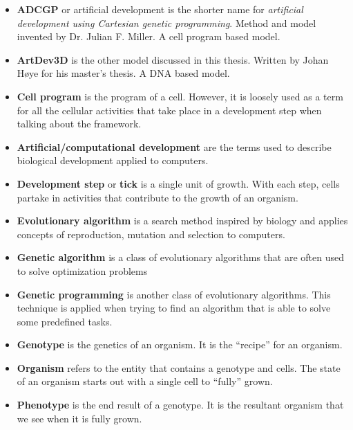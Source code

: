 \begin{itemize}
\itemsep=0pt
	\item\textbf{ADCGP} or artificial development is the shorter name for \emph{artificial development using Cartesian genetic programming}. Method and model invented by Dr. Julian F. Miller. A cell program based model.
	\item\textbf{ArtDev3D} is the other model discussed in this thesis. Written by Johan H{\o}ye for his master's thesis. A DNA based model.
	\item\textbf{Cell program} is the program of a cell. However, it is loosely used as a term for all the cellular activities that take place in a development step when talking about the framework.
	\item\textbf{Artificial/computational development} are the terms used to describe biological development applied to computers.
	\item\textbf{Development step} or \textbf{tick} is a single unit of growth. With each step, cells partake in activities that contribute to the growth of an organism.
	\item\textbf{Evolutionary algorithm} is a search method inspired by biology and applies concepts of reproduction, mutation and selection to computers.
	\item\textbf{Genetic algorithm} is a class of evolutionary algorithms that are often used to solve optimization problems
	\item\textbf{Genetic programming} is another class of evolutionary algorithms. This technique is applied when trying to find an algorithm that is able to solve some predefined tasks.
	\item\textbf{Genotype} is the genetics of an organism. It is the ``recipe'' for an organism.
	\item\textbf{Organism} refers to the entity that contains a genotype and cells. The state of an organism starts out with a single cell to ``fully'' grown.
	\item\textbf{Phenotype} is the end result of a genotype. It is the resultant organism that we see when it is fully grown.
\end{itemize}

